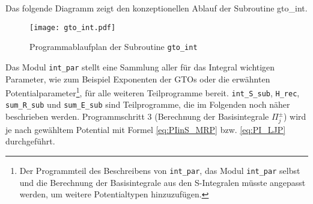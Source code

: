 Das folgende Diagramm zeigt den konzeptionellen Ablauf der Subroutine 
gto\_int.
%
\begin{figure}[H] \centering
	\texttt{[image: gto\_int.pdf]}
	\caption{Programmablaufplan der Subroutine \texttt{gto\_int}}
	\vspace{2mm} %
	\label{pic:FC:gto_int} 
\end{figure}
%
Das Modul \texttt{int\_par} stellt eine Sammlung aller für das Integral 
wichtigen 
Parameter, wie zum Beispiel Exponenten der GTOs oder die erwähnten 
Potentialparameter\footnote{Der Programmteil des Beschreibens von 
\texttt{int\_par}, das 
Modul \texttt{int\_par} selbst und die Berechnung der Basisintegrale aus den 
S-Integralen
müsste angepasst werden, um weitere Potentialtypen hinzuzufügen.}, für alle 
weiteren Teilprogramme bereit. 
\texttt{int\_S\_sub}, \texttt{H\_rec}, \texttt{sum\_R\_sub} und 
\texttt{sum\_E\_sub} sind Teilprogramme, die im 
Folgenden noch näher beschrieben werden. Programmschritt 3 (Berechnung der 
Basisintegrale $\Pi_j^\pm$) wird je nach gewähltem Potential mit Formel 
\ref{eq:PIinS_MRP} bzw. \ref{eq:PI_LJP} durchgeführt.
%
%
%
